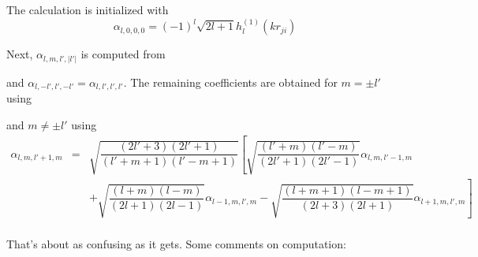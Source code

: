 The calculation is initialized with 
\begin{equation}
\alpha_{l,0,0,0} = (-1)^l\sqrt{2l+1}h_l^{(1)}(kr_{ji})
\end{equation}

Next, $\alpha_{l,m,l',\vert l'\vert}$ is computed from 


and $\alpha_{l,-l', l',-l'} = \alpha_{l,l',l',l'}$.  The remaining coefficients are obtained for $m = \pm l'$ using

%

and $m \ne \pm l'$ using
\begin{eqnarray}
\alpha_{l,m,l'+1,m} &=& \sqrt{\dfrac{(2l'+3)(2l'+1)}{(l'+m+1)(l'-m+1)}}\left[  \sqrt{\dfrac{(l'+m)(l'-m)}{(2l'+1)(2l'-1)}} \alpha_{l,m,l'-1,m}   \right. \nonumber \\
\ & \ & \left. + \sqrt{\dfrac{(l+m)(l-m)}{(2l+1)(2l-1)}}\alpha_{l-1,m,l',m} - \sqrt{\dfrac{(l+m+1)(l-m+1)}{(2l+3)(2l+1)}}\alpha_{l+1,m,l',m} \right] \nonumber \\
\end{eqnarray}

That's about as confusing as it gets.  Some comments on computation:

